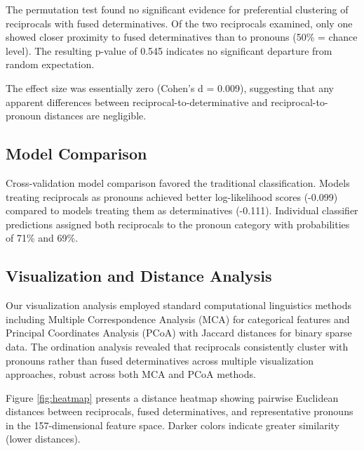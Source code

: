 \documentclass[12pt]{article}
\begin{document}
The permutation test found no significant evidence for preferential clustering of reciprocals with fused determinatives. Of the two reciprocals examined, only one showed closer proximity to fused determinatives than to pronouns (50\% = chance level). The resulting p-value of 0.545 indicates no significant departure from random expectation.

The effect size was essentially zero (Cohen's d = 0.009), suggesting that any apparent differences between reciprocal-to-determinative and reciprocal-to-pronoun distances are negligible.

\subsection{Model Comparison}

Cross-validation model comparison favored the traditional classification. Models treating reciprocals as pronouns achieved better log-likelihood scores (-0.099) compared to models treating them as determinatives (-0.111). Individual classifier predictions assigned both reciprocals to the pronoun category with probabilities of 71\% and 69\%.

\subsection{Visualization and Distance Analysis}

Our visualization analysis employed standard computational linguistics methods including Multiple Correspondence Analysis (MCA) for categorical features and Principal Coordinates Analysis (PCoA) with Jaccard distances for binary sparse data. The ordination analysis revealed that reciprocals consistently cluster with pronouns rather than fused determinatives across multiple visualization approaches, robust across both MCA and PCoA methods.

Figure \ref{fig:heatmap} presents a distance heatmap showing pairwise Euclidean distances between reciprocals, fused determinatives, and representative pronouns in the 157-dimensional feature space. Darker colors indicate greater similarity (lower distances).
\end{document}
